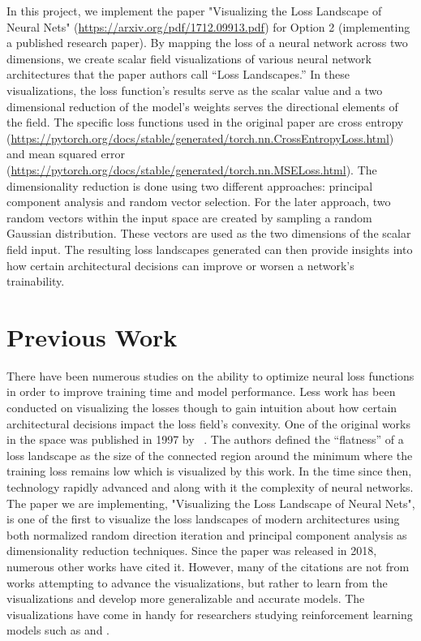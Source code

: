 \documentclass{acmsiggraph}
\begin{document}
In this project, we implement the paper "Visualizing the Loss Landscape of Neural Nets" (\url{https://arxiv.org/pdf/1712.09913.pdf}) for Option 2 (implementing a published research paper). 
By mapping the loss of a neural network across two dimensions, we create scalar field visualizations of various neural network architectures that the paper authors call “Loss Landscapes.” 
In these visualizations, the loss function’s results serve as the scalar value and a two dimensional reduction of the model’s weights serves the directional elements of the field. 
The specific loss functions used in the original paper are cross entropy (\url{https://pytorch.org/docs/stable/generated/torch.nn.CrossEntropyLoss.html}) and mean squared error (\url{https://pytorch.org/docs/stable/generated/torch.nn.MSELoss.html}).
The dimensionality reduction is done using two different approaches: principal component analysis and random vector selection. 
For the later approach, two random vectors within the input space are created by sampling a random Gaussian distribution. 
These vectors are used as the two dimensions of the scalar field input. 
The resulting loss landscapes generated can then provide insights into how certain architectural decisions can improve or worsen a network's trainability.


\section{Previous Work}
\label{sec:previous_work}

There have been numerous studies on the ability to optimize neural loss functions in order to improve training time and model performance. 
Less work has been conducted on visualizing the losses though to gain intuition about how certain architectural decisions impact the loss field's convexity. 
One of the original works in the space was published in 1997 by ~\cite{hochreiter1997flat}.
The authors defined the “flatness” of a loss landscape as the size of the connected region around the minimum where the training loss remains low which is visualized by this work. 
In the time since then, technology rapidly advanced and along with it the complexity of neural networks. The paper we are implementing, "Visualizing the Loss Landscape of Neural Nets",
is one of the first to visualize the loss landscapes of modern architectures using both normalized random direction iteration and principal component analysis as dimensionality reduction techniques.
Since the paper was released in 2018, numerous other works have cited it. 
However, many of the citations are not from works attempting to advance the visualizations, but rather to learn from the visualizations and develop more generalizable and accurate models.
The visualizations have come in handy for researchers studying reinforcement learning models such as \cite{actor2020} and \cite{plaat2022deep}.
\end{document}

